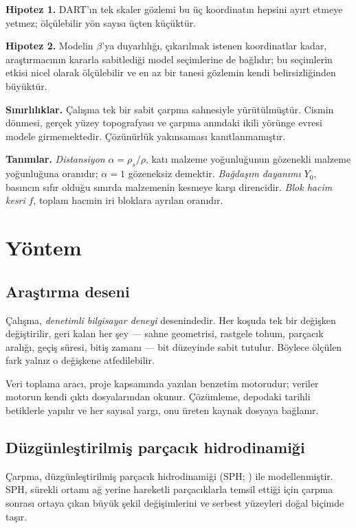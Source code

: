 \documentclass[12pt,a4paper]{article}
\begin{document}
\noindent\textbf{Hipotez 1.} DART'ın tek skaler gözlemi bu üç
koordinatın hepsini ayırt etmeye yetmez; ölçülebilir yön sayısı üçten
küçüktür.

\noindent\textbf{Hipotez 2.} Modelin $\beta$'ya duyarlılığı, çıkarılmak
istenen koordinatlar kadar, araştırmacının kararla sabitlediği model
seçimlerine de bağlıdır; bu seçimlerin etkisi nicel olarak ölçülebilir ve
en az bir tanesi gözlemin kendi belirsizliğinden büyüktür.

\noindent\textbf{Sınırlılıklar.} Çalışma tek bir sabit çarpma sahnesiyle
yürütülmüştür. Cismin dönmesi, gerçek yüzey topografyası ve çarpma
anındaki ikili yörünge evresi modele girmemektedir. Çözünürlük
yakınsaması kanıtlanmamıştır.

\noindent\textbf{Tanımlar.} \emph{Distansiyon} $\alpha=\rho_s/\rho$, katı
malzeme yoğunluğunun gözenekli malzeme yoğunluğuna oranıdır;
$\alpha=1$ gözeneksiz demektir. \emph{Bağdaşım dayanımı} $Y_0$,
basıncın sıfır olduğu sınırda malzemenin kesmeye karşı direncidir.
\emph{Blok hacim kesri} $f$, toplam hacmin iri bloklara ayrılan oranıdır.

\section{Yöntem}

\subsection{Araştırma deseni}

Çalışma, \emph{denetimli bilgisayar deneyi} desenindedir. Her koşuda tek
bir değişken değiştirilir, geri kalan her şey --- sahne geometrisi,
rastgele tohum, parçacık aralığı, geçiş süresi, bitiş zamanı --- bit
düzeyinde sabit tutulur. Böylece ölçülen fark yalnız o değişkene
atfedilebilir.

Veri toplama aracı, proje kapsamında yazılan benzetim motorudur; veriler
motorun kendi çıktı dosyalarından okunur. Çözümleme, depodaki tarihli
betiklerle yapılır ve her sayısal yargı, onu üreten kaynak dosyaya
bağlanır.

\subsection{Düzgünleştirilmiş parçacık hidrodinamiği}

Çarpma, düzgünleştirilmiş parçacık hidrodinamiği (SPH;
\citealp{monaghan1992}) ile modellenmiştir. SPH, sürekli ortamı ağ yerine
hareketli parçacıklarla temsil ettiği için çarpma sonrası ortaya çıkan
büyük şekil değişimlerini ve serbest yüzeyleri doğal biçimde taşır.
\end{document}
